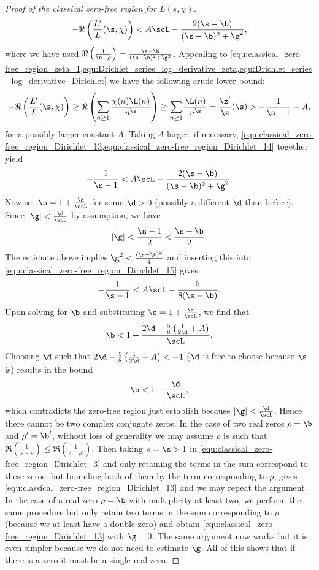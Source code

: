 \begin{proof}[Proof of the classical zero-free region for $L(s,\chi)$]
        \begin{equation}\label{equ:classical_zero-free_region_Dirichlet_13}
          -\Re\left(\frac{L'}{L}(\s,\chi)\right) < A\scL-\frac{2(\s-\b)}{(\s-\b)^{2}+\g^{2}},
        \end{equation}
        where we have used $\Re\left(\frac{1}{\s-\rho}\right) = \frac{\s-\b}{(\s-\b)^{2}+\g^{2}}$. Appealing to \cref{equ:classical_zero-free_region_zeta_1,equ:Drichlet_series_log_derivative_zeta,equ:Drichlet_series_log_derivative_Dirichlet} we have the following crude lower bound:
        \begin{equation}\label{equ:classical_zero-free_region_Dirichlet_14}
          -\Re\left(\frac{L'}{L}(\s,\chi)\right) \ge \Re\left(\sum_{n \ge 1}\frac{\chi(n)\L(n)}{n^{\s}}\right) \ge \sum_{n \ge 1}\frac{\L(n)}{n^{\s}} = \frac{\z'}{\z}(\s) > -\frac{1}{\s-1}-A,
        \end{equation}
        for a possibly larger constant $A$. Taking $A$ larger, if necessary, \cref{equ:classical_zero-free_region_Dirichlet_13,equ:classical_zero-free_region_Dirichlet_14} together yield
        \begin{equation}\label{equ:classical_zero-free_region_Dirichlet_15}
          -\frac{1}{\s-1} < A\scL-\frac{2(\s-\b)}{(\s-\b)^{2}+\g^{2}}.
        \end{equation}
        Now set $\s = 1+\frac{\d}{\scL}$ for some $\d > 0$ (possibly a different $\d$ than before). Since $|\g| < \frac{\d}{\scL}$ by assumption, we have
        \[
          |\g| < \frac{\s-1}{2} < \frac{\s-\b}{2}.
        \]
        The estimate above implies $\g^{2} < \frac{(\s-\b)^{2}}{4}$ and inserting this into \cref{equ:classical_zero-free_region_Dirichlet_15} gives
        \[
          -\frac{1}{\s-1} < A\scL-\frac{5}{8(\s-\b)}.
        \]
        Upon solving for $\b$ and substituting $\s = 1+\frac{\d}{\scL}$, we find that
        \[
          \b < 1+\frac{2\d-\frac{5}{8}\left(\frac{1}{2\d}+A\right)}{\scL}.
        \]
        Choosing $\d$ such that $2\d-\frac{5}{8}\left(\frac{1}{2\d}+A\right) < -1$ ($\d$ is free to choose because $\s$ is) results in the bound
        \[
          \b < 1-\frac{\d}{\scL},
        \]
        which contradicts the zero-free region just establish because $|\g| < \frac{\d}{\scL}$. Hence there cannot be two complex conjugate zeros. In the case of two real zeros $\rho = \b$ and $\rho' = \b'$, without loss of generality we may assume $\rho$ is such that $\Re\left(\frac{1}{s-\rho}\right) \le \Re\left(\frac{1}{s-\rho'}\right)$. Then taking $s = \s > 1$ in \cref{equ:classical_zero-free_region_Dirichlet_3} and only retaining the terms in the sum correspond to these zeros, but bounding both of them by the term corresponding to $\rho$, gives \cref{equ:classical_zero-free_region_Dirichlet_13} and we may repeat the argument. In the case of a real zero $\rho = \b$ with multiplicity at least two, we perform the same procedure but only retain two terms in the sum corresponding to $\rho$ (because we at least have a double zero) and obtain \cref{equ:classical_zero-free_region_Dirichlet_13} with $\g = 0$. The same argument now works but it is even simpler because we do not need to estimate $\g$. All of this shows that if there is a zero it must be a single real zero.

\end{proof}
